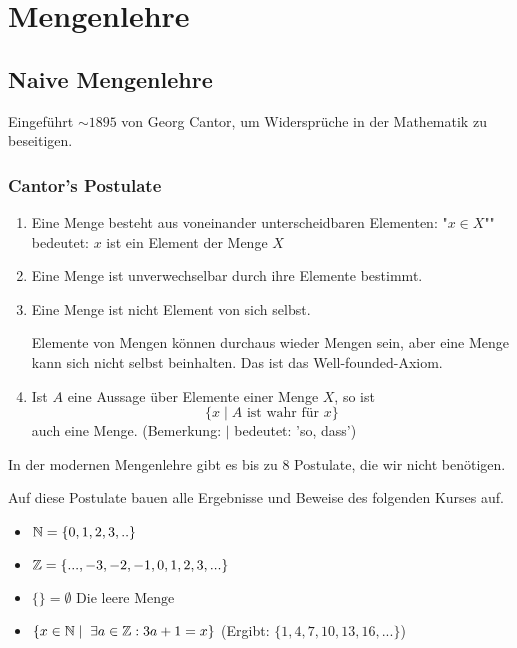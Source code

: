 \documentclass[main.tex]{subfiles}
\begin{document}
\chapter{Mengenlehre}

\section{Naive Mengenlehre}
Eingeführt $\sim 1895$ von Georg Cantor, um Widersprüche in der Mathematik zu beseitigen.
\subsection{Cantor's Postulate}
\begin{Definition}
  \begin{enumerate}
    \item Eine Menge besteht aus voneinander unterscheidbaren Elementen:
    "$x \in X$"" bedeutet: $x$ ist ein Element der Menge $X$
    \item Eine Menge ist unverwechselbar durch ihre Elemente bestimmt.
    \item Eine Menge ist nicht Element von sich selbst.
    \begin{Bemerkung}
      Elemente von Mengen können durchaus wieder Mengen sein, aber eine Menge kann sich nicht selbst beinhalten. Das ist das Well-founded-Axiom.
    \end{Bemerkung}
    \item Ist $A$ eine Aussage über Elemente einer Menge $X$, so ist
    $$\{x\mid A \text{ ist wahr für } x \}$$
    auch eine Menge. (Bemerkung: $\mid$ bedeutet: 'so, dass')
  \end{enumerate}
\end{Definition}

\begin{Bemerkung}
  In der modernen Mengenlehre gibt es bis zu 8 Postulate, die wir nicht benötigen.
\end{Bemerkung}
\begin{Bemerkung}
  Auf diese Postulate bauen alle Ergebnisse und Beweise des folgenden Kurses auf.
\end{Bemerkung}

\begin{Beispiel}
  \begin{itemize}
    \item $\mathbb{N} =\{ 0,1,2,3,..\} $
    \item $\mathbb{Z} = \{ ...,-3,-2,-1,0,1,2,3,...\} $
    \item $ \{ \} = \emptyset \text{ Die leere Menge}$
    \item $\{ x\in \mathbb{N} \mid \;\exists a \in \mathbb{Z} : 3a+1=x \}$ (Ergibt: $\{ 1,4,7,10,13,16,...\} $)
  \end{itemize}
\end{Beispiel}
\end{document}
